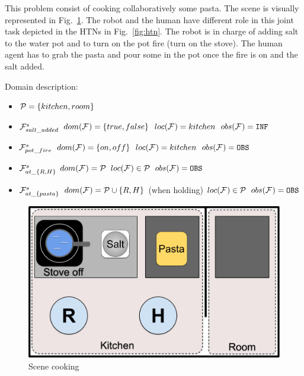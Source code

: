 \documentclass[letterpaper]{article} %
\begin{document}
This problem consist of cooking collaboratively some pasta. The scene is visually represented in Fig.~\ref{fig:scene}.
The robot and the human have different role in this joint task depicted in the HTNs in Fig.~\ref{fig:htn}. The robot is in charge of adding salt to the water pot and to turn on the pot fire (turn on the stove). The human agent has to grab the pasta and pour some in the pot once the fire is on and the salt added. 

Domain description:

\begin{itemize}
    \item $\mathcal{P} = \{ kitchen, room \}$
    
    \item $\mathcal{F}^{s}_{salt\_added}$
        \subitem $dom(\mathcal{F}^{}_{}) = \{ true, false \}$
        \subitem $loc(\mathcal{F}^{}_{}) = kitchen$
        \subitem $obs(\mathcal{F}^{}_{}) = \texttt{INF}$

    \item $\mathcal{F}^{s}_{pot\_fire}$
        \subitem $dom(\mathcal{F}^{}_{}) = \{ on, off \}$ 
        \subitem $loc(\mathcal{F}^{}_{}) = kitchen$ 
        \subitem $obs(\mathcal{F}^{}_{}) = \texttt{OBS}$ 
    
    \item $\mathcal{F}^{s}_{at\_\{R,H\}}$
        \subitem $dom(\mathcal{F}^{}_{}) = \mathcal{P}$ 
        \subitem $loc(\mathcal{F}^{}_{}) \in  \mathcal{P}$ 
        \subitem $obs(\mathcal{F}^{}_{}) = \texttt{OBS}$ 

    \item $\mathcal{F}^{s}_{at\_\{pasta\}}$
        \subitem $dom(\mathcal{F}^{}_{}) = \mathcal{P} \cup \{ R, H \}$ (when holding)
        \subitem $loc(\mathcal{F}^{}_{}) \in  \mathcal{P}$ 
        \subitem $obs(\mathcal{F}^{}_{}) = \texttt{OBS}$ 
    
\end{itemize}

\begin{figure}
    \centering
    \includegraphics[width=0.8\linewidth]{figures/scene.png}
    \caption{Scene cooking}
    \label{fig:scene}
\end{figure}
\end{document}
